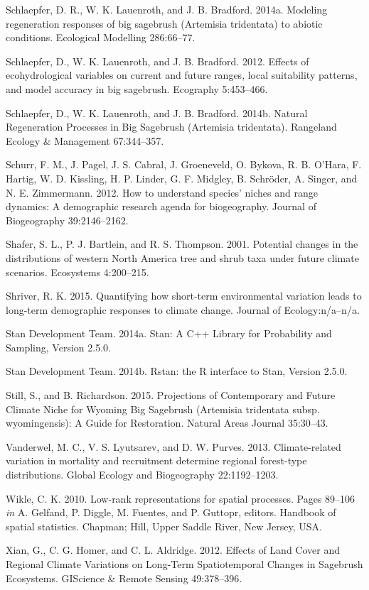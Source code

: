 \documentclass[12pt,]{article}
\begin{document}
Schlaepfer, D. R., W. K. Lauenroth, and J. B. Bradford. 2014a. Modeling
regeneration responses of big sagebrush (Artemisia tridentata) to
abiotic conditions. Ecological Modelling 286:66--77.

Schlaepfer, D., W. K. Lauenroth, and J. B. Bradford. 2012. Effects of
ecohydrological variables on current and future ranges, local
suitability patterns, and model accuracy in big sagebrush. Ecography
5:453--466.

Schlaepfer, D., W. K. Lauenroth, and J. B. Bradford. 2014b. Natural
Regeneration Processes in Big Sagebrush (Artemisia tridentata).
Rangeland Ecology \& Management 67:344--357.

Schurr, F. M., J. Pagel, J. S. Cabral, J. Groeneveld, O. Bykova, R. B.
O'Hara, F. Hartig, W. D. Kissling, H. P. Linder, G. F. Midgley, B.
Schr{ö}der, A. Singer, and N. E. Zimmermann. 2012. How to understand
species' niches and range dynamics: A demographic research agenda for
biogeography. Journal of Biogeography 39:2146--2162.

Shafer, S. L., P. J. Bartlein, and R. S. Thompson. 2001. Potential
changes in the distributions of western North America tree and shrub
taxa under future climate scenarios. Ecosystems 4:200--215.

Shriver, R. K. 2015. Quantifying how short-term environmental variation
leads to long-term demographic responses to climate change. Journal of
Ecology:n/a--n/a.

Stan Development Team. 2014a. Stan: A C++ Library for Probability and
Sampling, Version 2.5.0.

Stan Development Team. 2014b. Rstan: the R interface to Stan, Version
2.5.0.

Still, S., and B. Richardson. 2015. Projections of Contemporary and
Future Climate Niche for Wyoming Big Sagebrush (Artemisia tridentata
subsp. wyomingensis): A Guide for Restoration. Natural Areas Journal
35:30--43.

Vanderwel, M. C., V. S. Lyutsarev, and D. W. Purves. 2013.
Climate-related variation in mortality and recruitment determine
regional forest-type distributions. Global Ecology and Biogeography
22:1192--1203.

Wikle, C. K. 2010. Low-rank representations for spatial processes. Pages
89--106 \emph{in} A. Gelfand, P. Diggle, M. Fuentes, and P. Guttopr,
editors. Handbook of spatial statistics. Chapman; Hill, Upper Saddle
River, New Jersey, USA.

Xian, G., C. G. Homer, and C. L. Aldridge. 2012. Effects of Land Cover
and Regional Climate Variations on Long-Term Spatiotemporal Changes in
Sagebrush Ecosystems. GIScience \& Remote Sensing 49:378--396.
\end{document}
